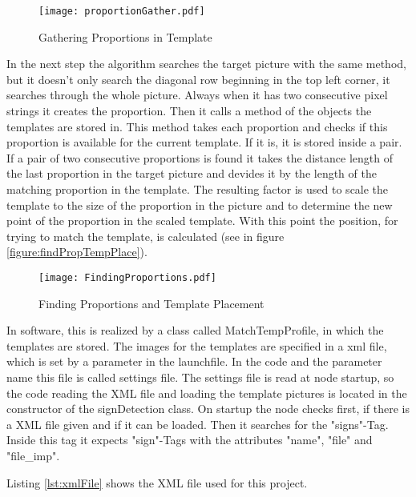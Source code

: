 \begin{figure}[H]
\begin{center}
  \texttt{[image: proportionGather.pdf]}
  \caption{Gathering Proportions in Template}
  \label{figure:templateProp}
\end{center}
\end{figure}

In the next step the algorithm searches the target picture with the same method, but
it doesn't only search the diagonal row beginning in the top left corner, it searches
through the whole picture. Always when it has two consecutive pixel strings it
creates the proportion. Then it calls a method of the objects the templates are stored in.
This method takes each proportion and checks if this proportion is available for
the current template. If it is, it is stored inside a pair. If a pair of two
consecutive proportions is found it takes the distance length of the last
proportion in the target picture and devides it by the length of the matching proportion
in the template. The resulting factor is used to scale the template to the size of the
proportion in the picture and to determine the new point of the proportion in the scaled template.
With this point the position, for trying to match the template, is calculated 
(see in figure \vref{figure:findPropTempPlace}).

\begin{figure}[H]
\begin{center}
  \texttt{[image: FindingProportions.pdf]}
  \caption{Finding Proportions and Template Placement}
  \label{figure:findPropTempPlace}
\end{center}
\end{figure} 

In software, this is realized by a class called MatchTempProfile, in which the templates are stored.
The images for the templates are specified in a xml file, which is set by a parameter in the launchfile.
\newpage 
In the code and the parameter name this file is called settings file. The settings file is read at node startup,
so the code reading the XML file and loading the template pictures is located in the constructor of the
signDetection class. On startup the node checks first, if there is a XML file given and if it can be loaded. 
Then it searches for the "signs"-Tag. Inside this tag it expects "sign"-Tags 
with the attributes "name", "file" and "file\_imp".

Listing \vref{lst:xmlFile} shows the XML file used for this project.

